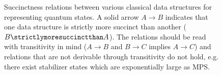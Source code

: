 \begin{figure}[h!]
\begin{center}
		\caption{Succinctness relations between various classical data structures for representing quantum states.
			A solid arrow $A\to B$ indicates that one data structure is strictly more succinct than another ($B\strictlymoresuccinctthan A$). 
			The relations should be read with transitivity in mind ($A\rightarrow B$ and $B\rightarrow C$ implies $A\rightarrow C$) and relations that are not derivable through transitivity do not hold, e.g. there exist stabilizer states which are exponentially large as MPS.
		}
		\label{fig:succinct}
	\end{center}
\end{figure}
